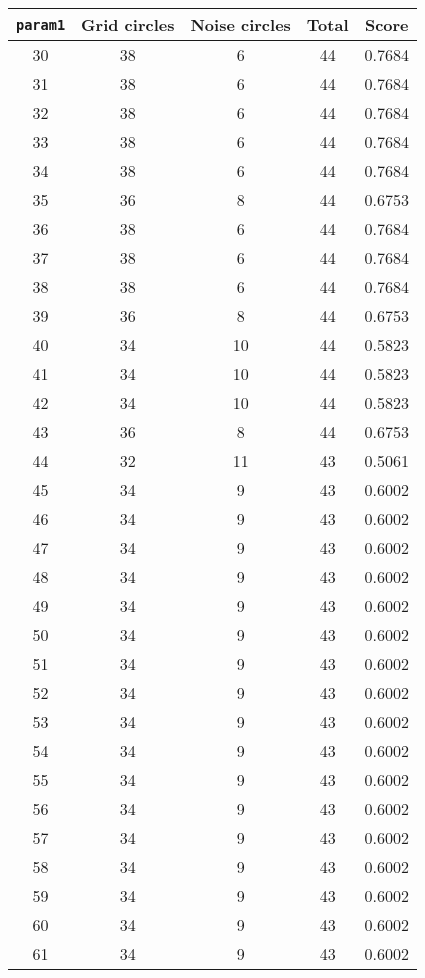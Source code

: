 \documentclass[letterpaper, 12pt]{article}
\begin{document}
\begin{longtable}{|c|c|c|c|c|}
\hline
\textbf{\texttt{param1}} & \textbf{Grid circles} & \textbf{Noise circles} & \textbf{Total} & \textbf{Score} \\
\hline
30 & 38 & 6 & 44 & 0.7684 \\
\hline
31 & 38 & 6 & 44 & 0.7684 \\
\hline
32 & 38 & 6 & 44 & 0.7684 \\
\hline
33 & 38 & 6 & 44 & 0.7684 \\
\hline
34 & 38 & 6 & 44 & 0.7684 \\
\hline
35 & 36 & 8 & 44 & 0.6753 \\
\hline
36 & 38 & 6 & 44 & 0.7684 \\
\hline
37 & 38 & 6 & 44 & 0.7684 \\
\hline
38 & 38 & 6 & 44 & 0.7684 \\
\hline
39 & 36 & 8 & 44 & 0.6753 \\
\hline
40 & 34 & 10 & 44 & 0.5823 \\
\hline
41 & 34 & 10 & 44 & 0.5823 \\
\hline
42 & 34 & 10 & 44 & 0.5823 \\
\hline
43 & 36 & 8 & 44 & 0.6753 \\
\hline
44 & 32 & 11 & 43 & 0.5061 \\
\hline
45 & 34 & 9 & 43 & 0.6002 \\
\hline
46 & 34 & 9 & 43 & 0.6002 \\
\hline
47 & 34 & 9 & 43 & 0.6002 \\
\hline
48 & 34 & 9 & 43 & 0.6002 \\
\hline
49 & 34 & 9 & 43 & 0.6002 \\
\hline
50 & 34 & 9 & 43 & 0.6002 \\
\hline
51 & 34 & 9 & 43 & 0.6002 \\
\hline
52 & 34 & 9 & 43 & 0.6002 \\
\hline
53 & 34 & 9 & 43 & 0.6002 \\
\hline
54 & 34 & 9 & 43 & 0.6002 \\
\hline
55 & 34 & 9 & 43 & 0.6002 \\
\hline
56 & 34 & 9 & 43 & 0.6002 \\
\hline
57 & 34 & 9 & 43 & 0.6002 \\
\hline
58 & 34 & 9 & 43 & 0.6002 \\
\hline
59 & 34 & 9 & 43 & 0.6002 \\
\hline
60 & 34 & 9 & 43 & 0.6002 \\
\hline
61 & 34 & 9 & 43 & 0.6002 \\

\end{longtable}
\end{document}
